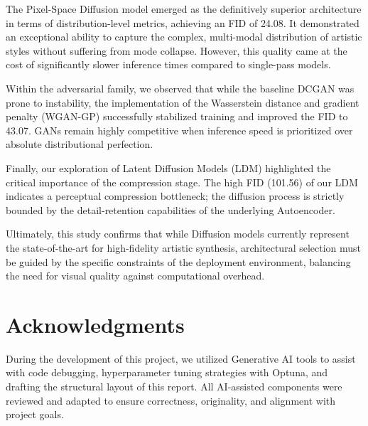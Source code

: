 \documentclass[runningheads]{llncs}
\begin{document}
The Pixel-Space Diffusion model emerged as the definitively superior architecture in terms of distribution-level metrics, achieving an FID of 24.08. It demonstrated an exceptional ability to capture the complex, multi-modal distribution of artistic styles without suffering from mode collapse. However, this quality came at the cost of significantly slower inference times compared to single-pass models.

Within the adversarial family, we observed that while the baseline DCGAN was prone to instability, the implementation of the Wasserstein distance and gradient penalty (WGAN-GP) successfully stabilized training and improved the FID to 43.07. GANs remain highly competitive when inference speed is prioritized over absolute distributional perfection.

Finally, our exploration of Latent Diffusion Models (LDM) highlighted the critical importance of the compression stage. The high FID (101.56) of our LDM indicates a perceptual compression bottleneck; the diffusion process is strictly bounded by the detail-retention capabilities of the underlying Autoencoder. 


Ultimately, this study confirms that while Diffusion models currently represent the state-of-the-art for high-fidelity artistic synthesis, architectural selection must be guided by the specific constraints of the deployment environment, balancing the need for visual quality against computational overhead.

\section*{Acknowledgments}
During the development of this project, we utilized Generative AI tools to assist with code debugging, hyperparameter tuning strategies with Optuna, and drafting the structural layout of this report. All AI-assisted components were reviewed and adapted to ensure correctness, originality, and alignment with project goals.

%
%
% 
% 
%
\printbibliography

\end{document}
